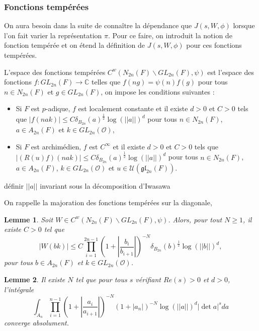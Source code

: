 \documentclass{amsart}
\newtheorem{lemme}{Lemme}[section]
\begin{document}
 \subsubsection{Fonctions tempérées}
 On aura besoin dans la suite de connaître la dépendance que $J(s, W, \phi)$ lorsque l'on fait varier la représentation $\pi$. Pour ce faire, on introduit la notion de fonction tempérée et on étend la définition de $J(s,W,\phi)$ pour ces fonctions tempérées.
 
 L'espace des fonctions tempérées $C^w(N_{2n}(F)\backslash{GL_{2n}(F)}, \psi)$ est l'espace des fonctions $f : GL_{2n}(F) \rightarrow \mathbb{C}$ telles que $f(ng) = \psi(n)f(g)$ pour tous $n \in N_{2n}(F)$ et $g \in GL_{2n}(F)$, on impose les conditions suivantes :
 \begin{itemize}
 \item Si $F$ est $p$-adique, $f$ est localement constante et il existe $d > 0$ et $C > 0$ tels que $|f(nak)| \leq C \delta_{B_{2n}}(a)^{\frac{1}{2}} \log(||a||)^d$ pour tous $n \in N_{2n}(F)$, $a \in A_{2n}(F)$ et $k \in GL_{2n}(\mathcal{O})$,
 \item Si $F$ est archimédien, $f$ est $C^\infty$ et il existe $d > 0$ et $C > 0$ tels que $|(R(u)f)(nak)| \leq C \delta_{B_{2n}}(a)^{\frac{1}{2}} \log(||a||)^d$ pour tous $n \in N_{2n}(F)$, $a \in A_{2n}(F)$, $k \in GL_{2n}(\mathcal{O})$ et $u \in \mathcal{U}(\mathfrak{gl}_{2n}(F))$.
 \end{itemize}
 
 définir $||a||$ invariant sous la décomposition d'Iwasawa
 
 
On rappelle la majoration des fonctions tempérées sur la diagonale,
\begin{lemme}
\label{majtemp}
Soit $W \in C^w(N_{2n}(F)\backslash{GL_{2n}(F)}, \psi)$. Alors, pour tout $N \geq 1$, il existe $C > 0$ tel que
\begin{equation}
|W(bk)| \leq C\prod_{i=1}^{2n-1} (1 + |\frac{b_i}{b_{i+1}}|)^{-N}\delta_{B_{2n}}(b)^{\frac{1}{2}}\log(||b||)^d,
\end{equation}
pour tous $b \in A_{2n}(F)$ et $k \in GL_{2n}(\mathcal{O})$.
\end{lemme}

\begin{lemme}
\label{convergenceAn}
Il existe $N$ tel que pour tous $s$ vérifiant $Re(s) > 0$ et $d > 0$, l'intégrale
\begin{equation}
\int_{A_n} \prod_{i=1}^{n-1} (1+|\frac{a_i}{a_{i+1}}|)^{-N}(1+|a_n|)^{-N}\log(||a||)^d|\det a|^s da
\end{equation}
converge absolument.
\end{lemme}
\end{document}
